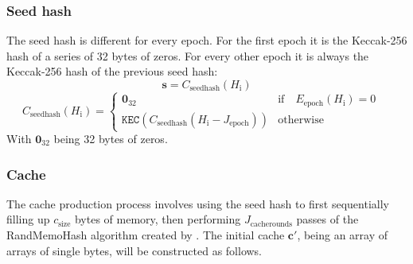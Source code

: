\documentclass[9pt,oneside]{amsart}
\begin{document}
\subsubsection{Seed hash}
The seed hash is different for every epoch. For the first epoch it is the Keccak-256 hash of a series of 32 bytes of zeros. For every other epoch it is always the Keccak-256 hash of the previous seed hash:
\begin{equation}
 \mathbf{s} = C_{\mathrm{seedhash}}(H_{\mathrm{i}})
\end{equation}
\begin{equation}
 C_{\mathrm{seedhash}}(H_{\mathrm{i}}) = \begin{cases}
\mathbf{0}_{32} & \text{if} \quad E_{\mathrm{epoch}}(H_{\mathrm{i}}) = 0 \quad  \\
\texttt{KEC}(C_{\mathrm{seedhash}}(H_{\mathrm{i}} - J_{\mathrm{epoch}})) & \text{otherwise}
\end{cases}
\end{equation}
With $\mathbf{0}_{32}$ being 32 bytes of zeros.

\subsubsection{Cache}
The cache production process involves using the seed hash to first sequentially filling up $c_{\mathrm{size}}$ bytes of memory, then performing $J_{\mathrm{cacherounds}}$ passes of the RandMemoHash algorithm created by \cite{lerner2014randmemohash}. The initial cache $\mathbf{c'}$, being an array of arrays of single bytes, will be constructed as follows.
\end{document}
